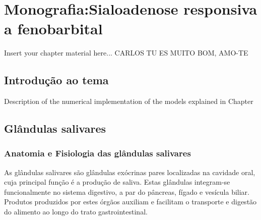 
\chapter{Monografia:Sialoadenose responsiva a fenobarbital}
\label{chapter:Monografia:Sialoadenose responsiva a fenobarbital}

Insert your chapter material here... CARLOS TU ES MUITO BOM, AMO-TE

\section{Introdução ao tema}
\label{section:Introdução ao tema}

Description of the numerical implementation of the models explained in Chapter

\section{Glândulas salivares}
\label{section:Glândulas salivares}

\subsection{Anatomia e Fisiologia das glândulas salivares}

As glândulas salivares são glândulas exócrinas pares localizadas na cavidade oral, cuja principal função é a produção de saliva. \cite{Mescher2018}Estas glândulas integram-se funcionalmente no sistema digestivo, a par do pâncreas, fígado e vesícula biliar. \cite{Mescher2018} Produtos produzidos por estes órgãos auxiliam e facilitam o transporte e digestão do alimento ao longo do trato gastrointestinal. \cite{Mescher2018}

